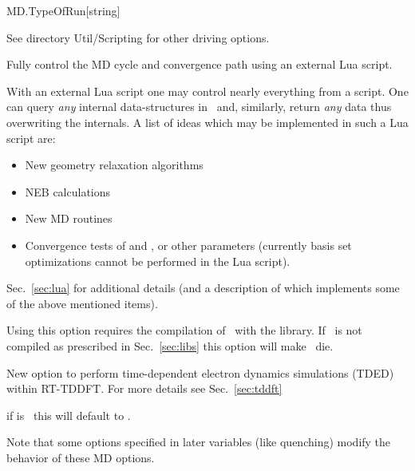 \begin{fdfentry}{MD.TypeOfRun}[string]
\begin{fdfoptions}
    See directory Util/Scripting  for other driving
    options.

    \option[Lua]%
    Fully control the MD cycle and convergence path using an external
    Lua script. 

    With an external Lua script one may control nearly everything from
    a script. One can query \emph{any} internal data-structures in
    \siesta\ and, similarly, return \emph{any} data thus overwriting
    the internals. A list of ideas which may be implemented in such a
    Lua script are:
    \begin{itemize}
      \item New geometry relaxation algorithms

      \item NEB calculations

      \item New MD routines

      \item Convergence tests of  and
      , or other parameters (currently basis
      set optimizations cannot be performed in the Lua script).

    \end{itemize}
    Sec.~\ref{sec:lua} for additional details (and a description of
     which implements some of the above mentioned items).

    Using this option requires the compilation of \siesta\ with the
     library.%
    If \siesta\ is not compiled as prescribed in Sec.~\ref{sec:libs}
    this option will make \siesta\ die.
    
    \option[TDED]%

    New option to perform time-dependent electron dynamics simulations (TDED) within RT-TDDFT.
    For more details see Sec.~\ref{sec:tddft}
     
  \end{fdfoptions}
  
  \note if  is \fdftrue\ this will default
  to .

  Note that some options specified in later variables (like quenching)
  modify the behavior of these MD options.


\end{fdfentry}
